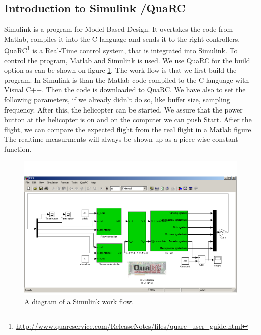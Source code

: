 \subsection{Introduction to Simulink /QuaRC}

Simulink is a program for Model-Based Design. It overtakes the code from Matlab, compiles it into the C language and sends it to the right controllers. QuaRC\footnote{\url{http://www.quarcservice.com/ReleaseNotes/files/quarc_user_guide.html}} is a Real-Time control system, that is integrated into Simulink. To control the program, Matlab and Simulink is used. We use QuaRC for the build option as can be shown on figure \ref{fig:simDiag}. 
The work flow is that we first build the program. In Simulink is than the Matlab code compiled to the C language with Visual C++. Then the code is downloaded to QuaRC. We have also to set the following parameters, if we already didn't do so, like buffer size, sampling frequency. After this, the helicopter can be started. We assure that the power button at the helicopter is on and on the computer we can push Start. After the flight, we can compare the expected flight from the real flight in a Matlab figure. The realtime measurments will always be shown up as a piece wise constant function. 

\begin{figure}[H]
\includegraphics[width=\textwidth]{simulinkDiag.png}
\caption{A diagram of a Simulink work flow.}
\label{fig:simDiag}
\end{figure} 
